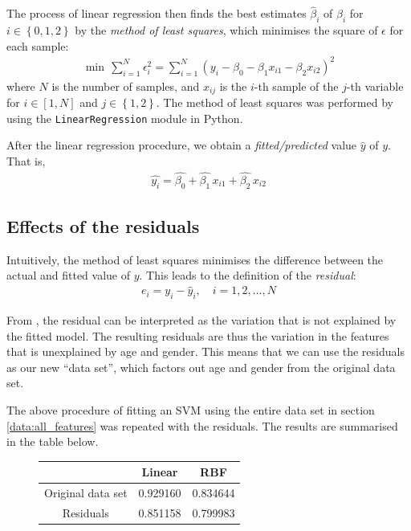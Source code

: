 \documentclass[12pt, twoside, a4paper]{report}
\begin{document}
The process of linear regression then finds the best estimates $\widehat{\beta}_i$ of $\beta_i$ for $i \in \left\lbrace 0,1,2 \right\rbrace$ by the \textit{method of least squares}, which minimises the square of $\epsilon$ for each sample:
\begin{align*}
\min \, \sum_{i=1}^N \epsilon_i^2 = \sum_{i=1}^N \left( y_i - \beta_0 - \beta_1x_{i1} - \beta_2x_{i2} \right)^2
\end{align*}
where $N$ is the number of samples, and $x_{ij}$ is the $i$-th sample of the $j$-th variable for $i \in [1,N]$ and $j \in \left\lbrace 1,2 \right\rbrace$. The method of least squares was performed by using the \texttt{LinearRegression} module in Python.

After the linear regression procedure, we obtain a \textit{fitted/predicted} value $\widehat{y}$ of $y$. That is,
\begin{align*}
\widehat{y_i} = \widehat{\beta_0} + \widehat{\beta_1} \, x_{i1} + \widehat{\beta_2} \, x_{i2}
\end{align*}

\subsection{Effects of the residuals}

Intuitively, the method of least squares minimises the difference between the actual and fitted value of $y$. This leads to the definition of the \textit{residual}:
\begin{align*}
e_i = y_i - \widehat{y}_i, \quad i=1,2,\dots,N
\end{align*}

From \cite{RefWorks:252}, the residual can be interpreted as the variation that is not explained by the fitted model. The resulting residuals are thus the variation in the features that is unexplained by age and gender. This means that we can use the residuals as our new ``data set'', which factors out age and gender from the original data set.

The above procedure of fitting an SVM using the entire data set in section \ref{data:all_features} was repeated with the residuals. The results are summarised in the table below.

\begin{figure}[h]
\begin{center}
    \begin{tabular}{| c | c | c | } \hline
      & Linear & RBF \\ \hline
    Original data set & 0.929160 & 0.834644 \\ \hline
	Residuals & 0.851158  & 0.799983 \\ \hline
    \end{tabular}
\end{center}
\end{figure}
\end{document}
